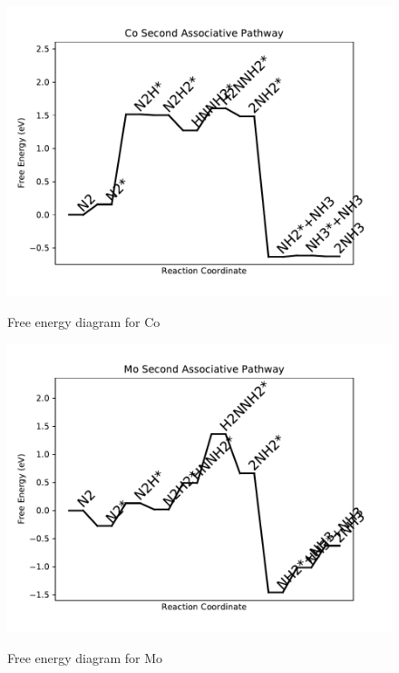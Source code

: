\documentclass{article}
\begin{document}
\newpage
\begin{figure}
\includegraphics[width=1\linewidth]{data/plots/Co_associative_2.pdf}
\label{fig:Co_associative_2}
\caption{Free energy diagram for Co}
\end{figure}

\begin{figure}
\includegraphics[width=1\linewidth]{data/plots/Mo_associative_2.pdf}
\label{fig:Mo_associative_2}
\caption{Free energy diagram for Mo}
\end{figure}
\end{document}
